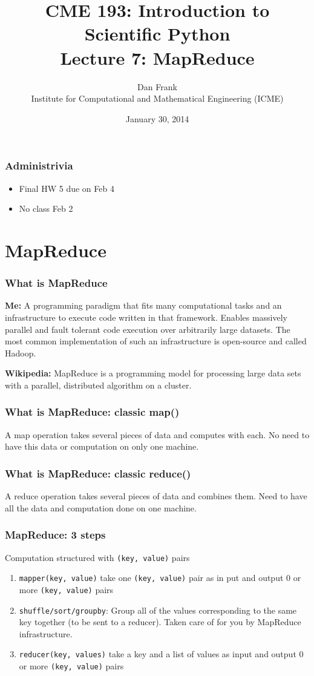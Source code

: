 \documentclass{beamer}
\title{CME 193: Introduction to Scientific Python \\
Lecture 7: MapReduce}
\author{
Dan Frank \\
\vspace{0.1in}
Institute for Computational and Mathematical Engineering (ICME)}
\date{January 30, 2014}
\begin{document}
\maketitle

\begin{frame}
\frametitle{Administrivia}
\begin{itemize} 
\setlength{\itemsep}{0.1in}
\item{Final HW 5 due on Feb 4 }
\item{No class Feb 2}
\end{itemize}
\end{frame}




\section{MapReduce} 

\begin{frame}
\frametitle{What is MapReduce}

\textbf{Me:} A programming paradigm that fits many computational tasks and an infrastructure to execute code written in that framework. Enables massively parallel and fault tolerant code execution over arbitrarily large datasets. The most common implementation of such an infrastructure is open-source and called Hadoop.

\textbf{Wikipedia:} MapReduce is a programming model for processing large data sets with a parallel, distributed algorithm on a cluster.

\end{frame}

\begin{frame}
\frametitle{What is MapReduce: classic map()}
A map operation takes several pieces of data and computes with each. 
No need to have this data or computation on only one machine. 
\end{frame}

\begin{frame}
\frametitle{What is MapReduce: classic reduce()}
A reduce operation takes several pieces of data and combines them. 
Need to have all the data and computation done on one machine.
\end{frame}

\begin{frame}
\frametitle{MapReduce: 3 steps}
Computation structured with \texttt{(key, value)} pairs
\begin{enumerate}
\item \texttt{mapper(key, value)} take one \texttt{(key, value)} pair as in put and output 0 or more \texttt{(key, value)} pairs
\item \texttt{shuffle/sort/groupby}: Group all of the values corresponding to the same key together (to be sent to a reducer). Taken care of for you by MapReduce infrastructure.  
\item \texttt{reducer(key, values)} take a key and a list of values as input and output 0 or more \texttt{(key, value)} pairs
\end{enumerate}
\end{frame}
\end{document}
